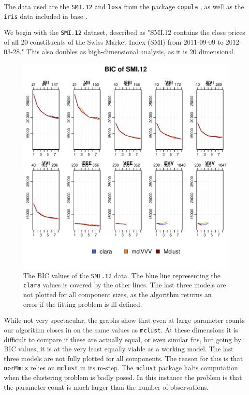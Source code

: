 The data used are the {\tt SMI.12} and {\tt loss} from the package {\tt copula}
\cite{cop18}, as well as the {\tt iris} data included in base \Rp.

We begin with the {\tt SMI.12} dataset, described as "SMI.12 contains the close prices of all 20 constituents of the Swiss Market Index (SMI) from 2011-09-09 to 2012-03-28." This also doubles as high-dimensional analysis, as it is 20 dimensional.


\begin{figure}[h!]
    \begin{Rgraph}[0.9]
\includegraphics{chapter3-2smiplot}
    \end{Rgraph}
    \caption{The BIC values of the {\tt SMI.12} data. The blue line representing
             the {\tt clara} values is covered by the other lines. The last 
             three models are not plotted for all component sizes, as the 
             algorithm returns an error if the fitting problem is ill defined.}
    \label{}
\end{figure}

While not very spectacular, the graphs show that even at large parameter
counts our algorithm closes in on the same values as {\tt mclust}.
At these dimensions it is difficult to compare if these are actually 
equal, or even similar fits, but going by BIC values, it is at the very 
least equally viable as a working model.
The last three models are not fully plotted for all components. The reason for 
this is that {\tt norMmix} relies on {\tt mclust} in its m-step. The 
{\tt mclust} package halts computation when the clustering problem is badly 
posed. In this instance the problem is that the parameter count is much larger 
than the number of observations.


